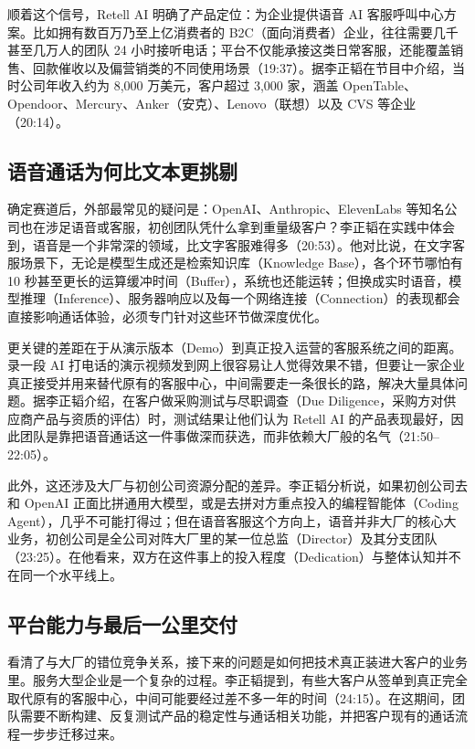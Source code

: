 \documentclass[UTF8,a4paper,11pt,fontset=fandol]{ctexart}
\begin{document}
顺着这个信号，Retell AI 明确了产品定位：为企业提供语音 AI 客服呼叫中心方案。比如拥有数百万乃至上亿消费者的 B2C（面向消费者）企业，往往需要几千甚至几万人的团队 24 小时接听电话；平台不仅能承接这类日常客服，还能覆盖销售、回款催收以及偏营销类的不同使用场景（19:37）。据李正韬在节目中介绍，当时公司年收入约为 8,000 万美元，客户超过 3,000 家，涵盖 OpenTable、Opendoor、Mercury、Anker（安克）、Lenovo（联想）以及 CVS 等企业（20:14）。

\subsection{语音通话为何比文本更挑剔}
确定赛道后，外部最常见的疑问是：OpenAI、Anthropic、ElevenLabs 等知名公司也在涉足语音或客服，初创团队凭什么拿到重量级客户？李正韬在实践中体会到，语音是一个非常深的领域，比文字客服难得多（20:53）。他对比说，在文字客服场景下，无论是模型生成还是检索知识库（Knowledge Base），各个环节哪怕有 10 秒甚至更长的运算缓冲时间（Buffer），系统也还能运转；但换成实时语音，模型推理（Inference）、服务器响应以及每一个网络连接（Connection）的表现都会直接影响通话体验，必须专门针对这些环节做深度优化。

更关键的差距在于从演示版本（Demo）到真正投入运营的客服系统之间的距离。录一段 AI 打电话的演示视频发到网上很容易让人觉得效果不错，但要让一家企业真正接受并用来替代原有的客服中心，中间需要走一条很长的路，解决大量具体问题。据李正韬介绍，在客户做采购测试与尽职调查（Due Diligence，采购方对供应商产品与资质的评估）时，测试结果让他们认为 Retell AI 的产品表现最好，因此团队是靠把语音通话这一件事做深而获选，而非依赖大厂般的名气（21:50–22:05）。

此外，这还涉及大厂与初创公司资源分配的差异。李正韬分析说，如果初创公司去和 OpenAI 正面比拼通用大模型，或是去拼对方重点投入的编程智能体（Coding Agent），几乎不可能打得过；但在语音客服这个方向上，语音并非大厂的核心大业务，初创公司是全公司对阵大厂里的某一位总监（Director）及其分支团队（23:25）。在他看来，双方在这件事上的投入程度（Dedication）与整体认知并不在同一个水平线上。

\subsection{平台能力与最后一公里交付}
看清了与大厂的错位竞争关系，接下来的问题是如何把技术真正装进大客户的业务里。服务大型企业是一个复杂的过程。李正韬提到，有些大客户从签单到真正完全取代原有的客服中心，中间可能要经过差不多一年的时间（24:15）。在这期间，团队需要不断构建、反复测试产品的稳定性与通话相关功能，并把客户现有的通话流程一步步迁移过来。
\end{document}
